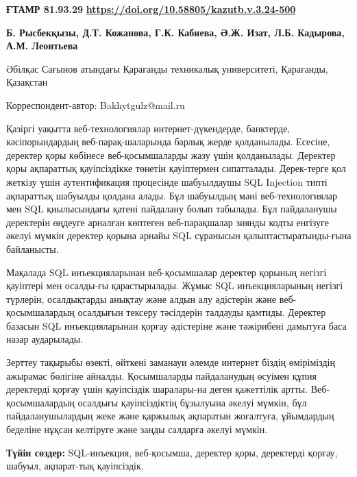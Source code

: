 \newpage
{\bfseries ҒТАМР 81.93.29}
\hfill {\bfseries \href{https://doi.org/10.58805/kazutb.v.3.24-500}{https://doi.org/10.58805/kazutb.v.3.24-500}}

\begin{center}

{\bfseries Б. Рысбекқызы\envelope, Д.Т. Кожанова, Г.К. Кабиева,
Ә.Ж. Изат, Л.Б. Кадырова, А.М. Леонтьева}

Әбілқас Сағынов атындағы Қарағанды техникалық университеті, Қарағанды,
Қазақстан
\end{center}
\envelope Корреспондент-автор: Bakhytgulz@mail.ru\vspace{0.5cm}

Қазіргі уақытта веб-технологиялар интернет-дүкендерде, банктерде,
кәсіпорындардың веб-парақ-шаларында барлық жерде қолданылады. Есесіне,
деректер қоры көбінесе веб-қосымшаларды жазу үшін қолданылады. Деректер
қоры ақпараттық қауіпсіздікке төнетін қауіптермен сипатталады.
Дерек-терге қол жеткізу үшін аутентификация процесінде шабуылдаушы SQL
Injection типті ақпараттық шабуылды қолдана алады. Бұл шабуылдың мәні
веб-технологиялар мен SQL қиылысындағы қатені пайдалану болып табылады.
Бұл пайдаланушы деректерін өңдеуге арналған көптеген веб-парақшалар
зиянды кодты енгізуге әкелуі мүмкін деректер қорына арнайы SQL сұранысын
қалыптастыратынды-ғына байланысты.

Мақалада SQL инъекцияларынан веб-қосымшалар деректер қорының негізгі
қауіптері мен осалды-ғы қарастырылады. Жұмыс SQL инъекцияларының негізгі
түрлерін, осалдықтарды анықтау және алдын алу әдістерін және
веб-қосымшалардың осалдығын тексеру тәсілдерін талдауды қамтиды.
Деректер базасын SQL инъекцияларынан қорғау әдістеріне және тәжірибені
дамытуға баса назар аударылады.

Зерттеу тақырыбы өзекті, өйткені заманауи әлемде интернет біздің
өміріміздің ажырамас бөлігіне айналды. Қосымшаларды пайдаланудың өсуімен
құпия деректерді қорғау үшін қауіпсіздік шаралары-на деген қажеттілік
артты. Веб-қосымшалардың осалдығы қауіпсіздіктің бұзылуына әкелуі
мүмкін, бұл пайдаланушылардың жеке және қаржылық ақпаратын жоғалтуға,
ұйымдардың беделіне нұқсан келтіруге және заңды салдарға әкелуі мүмкін.

{\bfseries Түйін сөздер:} SQL-инъекция, веб-қосымша, деректер қоры,
деректерді қорғау, шабуыл, ақпарат-тық қауіпсіздік.


